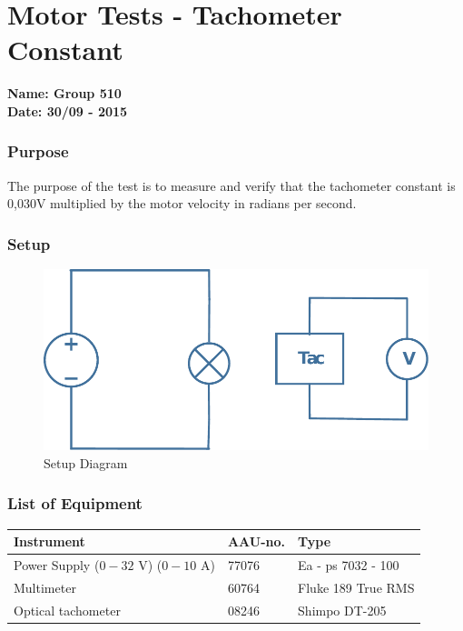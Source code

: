 \pagebreak
\section{Motor Tests - Tachometer Constant} %
\textbf{Name: Group 510}\\
\textbf{Date: 30/09 - 2015}

\subsubsection{Purpose}
The purpose of the test is to measure and verify that the tachometer constant is 0,030\si{V} multiplied by the motor velocity in radians per second.

\subsubsection{Setup}
\begin{figure}[H]
  \centering
	\includegraphics[scale=0.5]{figures/MotorTest3.pdf}
	\caption{Setup Diagram}
	\flushleft
\end{figure}\vspace{-5mm}

\subsubsection{List of Equipment}

\begin{table}[H]
\begin{tabular}{|l|l|p{4cm}|}
\hline%
  \textbf{Instrument}                    &  \textbf{AAU-no.}  &  \textbf{Type}       \\
\hline%
  Power Supply ($0 - 32$ V) ($0 - 10$ A) &  77076             &  Ea - ps 7032 - 100  \\
\hline%
  Multimeter                             &  60764             &  Fluke 189 True RMS  \\
\hline%
  Optical tachometer                     &  08246             &  Shimpo DT-205       \\
\hline%
\end{tabular}
\end{table}

